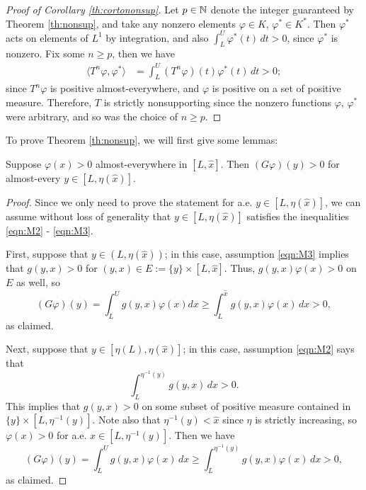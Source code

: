 \begin{proof}[Proof of Corollary \ref{th:cortononsup}]
	Let $p \in \mathbb{N}$ denote the integer guaranteed by Theorem \ref{th:nonsup}, and take any nonzero elements $\varphi \in K$, $\varphi^* \in K^*$. Then $\varphi^*$ acts on elements of $L^1$ by integration, and also $\int_L^U \varphi^*(t) \, dt > 0$, since $\varphi^*$ is nonzero. Fix some $n \geq p$, then we have
	\begin{align*}
		\langle T^n \varphi, \varphi^* \rangle &= \int_L^U (T^n \varphi)(t)\varphi^*(t) \, dt > 0;
	\end{align*}
	since $T^n\varphi$ is positive almost-everywhere, and $\varphi$ is positive on a set of positive measure. Therefore, $T$ is strictly nonsupporting since the nonzero functions $\varphi$, $\varphi^*$ were arbitrary, and so was the choice of $n \geq p$. 
\end{proof}

To prove Theorem \ref{th:nonsup}, we will first give some lemmas:

\begin{lemma}
	Suppose $\varphi(x)>0$ almost-everywhere in $[L, \hat x]$. Then $(G\varphi)(y) > 0$ for almost-every $y \in [L, \eta(\hat x)]$.
\end{lemma}

\begin{proof}
	Since we only need to prove the statement for a.e. $y \in [L, \eta(\hat x)]$, we can assume without loss of generality that $y \in [L, \eta(\hat x)]$ satisfies the inequalities \eqref{eqn:M2} - \eqref{eqn:M3}.
	
	First, suppose that $y \in (L, \eta(\hat x))$; in this case, assumption \eqref{eqn:M3} implies that $g(y, x) >0$ for $(y, x) \in E:=\{y\} \times [L, \hat x]$. Thus, $g(y, x) \varphi(x)>0$ on $E$ as well, so
	\[(G\varphi)(y) = \int_L^U g(y, x) \varphi(x) dx \geq \int_L^{\hat x} g(y, x) \varphi(x) \, dx >0, \]
	as claimed.
	
	Next, suppose that $y \in [\eta(L), \eta(\hat x)]$; in this case, assumption \eqref{eqn:M2} says that
	\[\int_L^{\eta^{-1}(y)} g(y, x) \, dx >0.\]
	This implies that $g(y, x) >0$ on some subset of positive measure contained in $\{y\} \times [L, \eta^{-1}(y)]$. Note also that $\eta^{-1}(y) < \hat x$ since $\eta$ is strictly increasing, so $\varphi(x) >0$ for a.e. $x \in [L, \eta^{-1}(y)]$. Then we have
	\[(G\varphi)(y) = \int_L^U g(y, x) \varphi(x) \, dx \geq \int_L^{\eta^{-1}(y)} g(y, x) \varphi(x) \, dx > 0,\]
	as claimed.
	
\end{proof}

